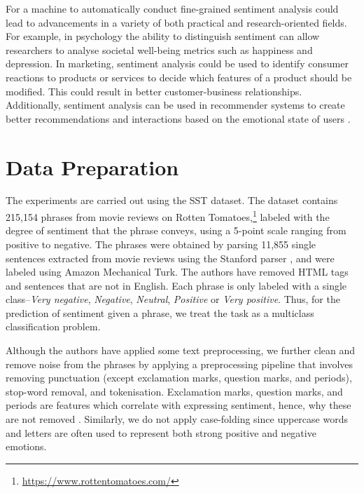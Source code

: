 \documentclass{article}
\begin{document}
For a machine to automatically conduct fine-grained sentiment analysis could lead to advancements in a variety of both practical and research-oriented fields. For example, in psychology the ability to distinguish sentiment can allow researchers to analyse societal well-being metrics such as happiness and depression. In marketing, sentiment analysis could be used to identify consumer reactions to products or services to decide which features of a product should be modified. This could result in better customer-business relationships. Additionally, sentiment analysis can be used in recommender systems to create better recommendations and interactions based on the emotional state of users \cite{DBLP:journals/corr/abs-1806-00674}.

\section{Data Preparation}
\label{data-prep}

The experiments are carried out using the SST dataset. The dataset contains 215,154 phrases from movie reviews on Rotten Tomatoes,\footnote{\url{https://www.rottentomatoes.com/}} labeled with the degree of sentiment that the phrase conveys, using a 5-point scale ranging from positive to negative. The phrases were obtained by parsing 11,855 single sentences extracted from movie reviews using the Stanford parser \cite{klein-manning-2003-accurate}, and were labeled using Amazon Mechanical Turk. The authors \cite{socher-etal-2013-recursive} have removed HTML tags and sentences that are not in English. Each phrase is only labeled with a single class--\emph{Very negative}, \emph{Negative}, \emph{Neutral}, \emph{Positive} or \emph{Very positive}. Thus, for the prediction of sentiment given a phrase, we treat the task as a multiclass classification problem. 

Although the authors \cite{socher-etal-2013-recursive} have applied some text preprocessing, we further clean and remove noise from the phrases by applying a preprocessing pipeline that involves removing punctuation (except exclamation marks, question marks, and periods), stop-word removal, and tokenisation. Exclamation marks, question marks, and periods are features which correlate with expressing sentiment, hence, why these are not removed \cite{SYMEONIDIS2018298}. Similarly, we do not apply case-folding since uppercase words and letters are often used to represent both strong positive and negative emotions. 
\end{document}
